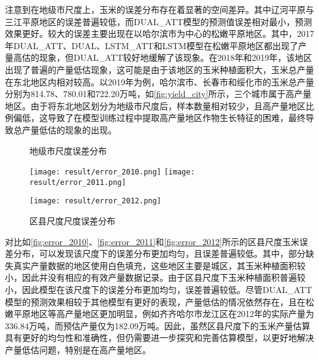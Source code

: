 \par 注意到在地级市尺度上，玉米的误差分布存在着显著的空间差异。其中辽河平原与三江平原地区的误差普遍较低，而DUAL\_ATT模型的预测值误差相对最小，预测效果更好。较大的误差主要出现在以哈尔滨市为中心的松嫩平原地区。其中，2017年DUAL\_ATT、DUAL、LSTM\_ATT和LSTM模型在松嫩平原地区都出现了产量高估的现象，但DUAL\_ATT较好地缓解了该现象。在2018年和2019年，该地区出现了普遍的产量低估现象，这可能是由于该地区的玉米种植面积大，玉米总产量在东北地区内相对较高。以2019年为例，哈尔滨市、长春市和绥化市的玉米总产量分别为814.78、780.01和722.20万吨，如\autoref{fig:yield_city}所示，三个城市属于高产量地区。由于将东北地区划分为地级市尺度后，样本数量相对较少，且高产量地区比例偏低，这导致了在模型训练过程中提取高产量地区作物生长特征的困难，最终导致总产量低估的现象的出现。

\begin{figure}
  \centering
  \hfill
\end{figure}
\begin{figure}\ContinuedFloat
  \centering
  \caption{地级市尺度误差分布}
\end{figure}
\begin{figure}
  \centering
  {\texttt{[image: result/error\_2010.png]}}\hfill
  {\texttt{[image: result/error\_2011.png]}}
\end{figure}
\begin{figure}\ContinuedFloat
  \centering
  {\texttt{[image: result/error\_2012.png]}}
  \caption{区县尺度尺度误差分布}
\end{figure}

\par 对比如\autoref{fig:error_2010}、\autoref{fig:error_2011}和\autoref{fig:error_2012}所示的区县尺度玉米误差分布，可以发现该尺度下的误差分布更加均匀，且误差普遍较低。其中，部分缺失真实产量数据的地区使用白色填充，这些地区主要是城区，其玉米种植面积较小，因此并没有相应的有效产量数据记录。由于区县尺度下玉米种植面积普遍较小，因此模型在该尺度下的误差分布更加均匀，误差普遍较低。尽管DUAL\_ATT模型的预测效果相较于其他模型有更好的表现，产量低估的情况依然存在，且在松嫩平原地区等高产量地区更加明显，例如齐齐哈尔市龙江区在2012年的实际产量为336.84万吨，而预估产量仅为182.09万吨。因此，虽然区县尺度下的玉米产量估算具有更好的均匀性和准确性，但仍需要进一步探究和完善估算模型，以更好地解决产量低估问题，特别是在高产量地区。

